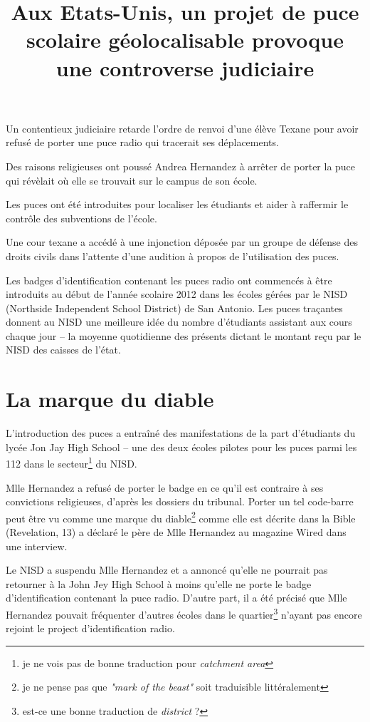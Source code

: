 \documentclass[a4paper,11pt]{article}
\title{Aux Etats-Unis, un projet de puce scolaire géolocalisable provoque une controverse judiciaire}
\author{}
\date{}
\begin{document}
\maketitle

Un contentieux judiciaire retarde l'ordre de renvoi d'une élève Texane pour avoir refusé de porter une puce radio
qui tracerait ses déplacements.

Des raisons religieuses ont poussé Andrea Hernandez à arrêter de porter la puce qui révèlait où elle se trouvait sur
le campus de son école.

Les puces ont été introduites pour localiser les étudiants et aider à raffermir le contrôle des subventions de l'école.

Une cour texane a accédé à une injonction déposée par un groupe de défense des droits civils dans l'attente d'une
audition à propos de l'utilisation des puces.

Les badges d'identification contenant les puces radio ont commencés à être introduits au début de l'année scolaire 2012
dans les écoles gérées par le NISD (Northside Independent School District) de San Antonio. Les puces traçantes donnent au
NISD une meilleure idée du nombre d'étudiants assistant aux cours chaque jour -- la moyenne quotidienne des présents
dictant le montant reçu par le NISD des caisses de l'état.

\section*{La marque du diable}

L'introduction des puces a entraîné des manifestations de la part d'étudiants du lycée Jon Jay High School -- une des
deux écoles pilotes pour les puces parmi les 112 dans le secteur\footnote{je ne vois pas de bonne traduction
pour \textit{catchment area}} du NISD.

Mlle Hernandez a refusé de porter le badge en ce qu'il est contraire à ses convictions religieuses, d'après les dossiers
du tribunal.
Porter un tel code-barre peut être vu comme une marque du diable\footnote{je ne pense pas que \textit{"mark of the
beast"} soit traduisible littéralement} comme elle est décrite dans la Bible (Revelation, 13) a déclaré le père de Mlle
Hernandez au magazine Wired dans une interview.

Le NISD a suspendu Mlle Hernandez et a annoncé qu'elle ne pourrait pas retourner à la John Jey High School à moins
qu'elle ne porte le badge d'identification contenant la puce radio. D'autre part, il a été précisé que Mlle Hernandez
pouvait fréquenter d'autres écoles dans le quartier\footnote{est-ce une bonne traduction de \textit{district} ?} n'ayant
pas encore rejoint le project d'identification radio.
\end{document}
